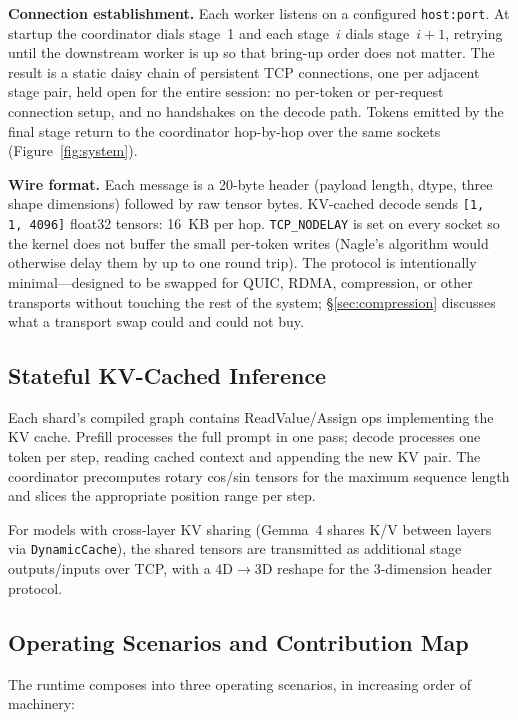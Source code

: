 \documentclass[11pt]{article}
\begin{document}
\textbf{Connection establishment.} Each worker listens on a configured \texttt{host:port}. At startup the coordinator dials stage~1 and each stage~$i$ dials stage~$i\!+\!1$, retrying until the downstream worker is up so that bring-up order does not matter. The result is a static daisy chain of persistent TCP connections, one per adjacent stage pair, held open for the entire session: no per-token or per-request connection setup, and no handshakes on the decode path. Tokens emitted by the final stage return to the coordinator hop-by-hop over the same sockets (Figure~\ref{fig:system}).

\textbf{Wire format.} Each message is a 20-byte header (payload length, dtype, three shape dimensions) followed by raw tensor bytes. KV-cached decode sends \texttt{[1,\,1,\,4096]} float32 tensors: 16~KB per hop. \texttt{TCP\_NODELAY} is set on every socket so the kernel does not buffer the small per-token writes (Nagle's algorithm would otherwise delay them by up to one round trip). The protocol is intentionally minimal---designed to be swapped for QUIC, RDMA, compression, or other transports without touching the rest of the system; \S\ref{sec:compression} discusses what a transport swap could and could not buy.

\subsection{Stateful KV-Cached Inference}

Each shard's compiled graph contains ReadValue/Assign ops implementing the KV cache. Prefill processes the full prompt in one pass; decode processes one token per step, reading cached context and appending the new KV pair. The coordinator precomputes rotary cos/sin tensors for the maximum sequence length and slices the appropriate position range per step.

For models with cross-layer KV sharing (Gemma~4 shares K/V between layers via \texttt{DynamicCache}), the shared tensors are transmitted as additional stage outputs/inputs over TCP, with a 4D$\rightarrow$3D reshape for the 3-dimension header protocol.

\subsection{Operating Scenarios and Contribution Map}
\label{sec:scenarios}

The runtime composes into three operating scenarios, in increasing order of machinery:
\end{document}
